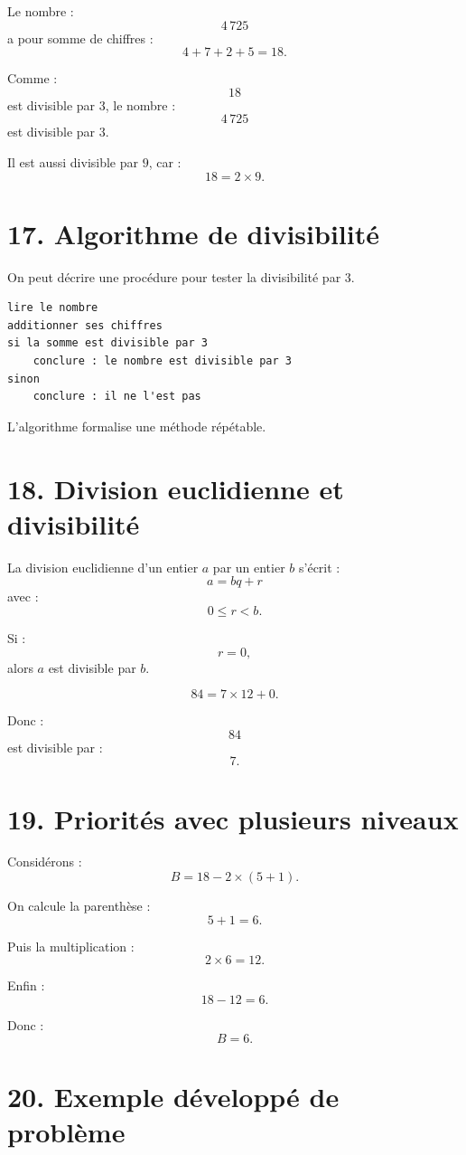Le nombre :
\[
4\,725
\]
a pour somme de chiffres :
\[
4+7+2+5=18.
\]

Comme :
\[
18
\]
est divisible par $3$, le nombre :
\[
4\,725
\]
est divisible par $3$.

Il est aussi divisible par $9$, car :
\[
18=2\times9.
\]

\section{17. Algorithme de divisibilité}

On peut décrire une procédure pour tester la divisibilité par $3$.

\begin{verbatim}
lire le nombre
additionner ses chiffres
si la somme est divisible par 3
    conclure : le nombre est divisible par 3
sinon
    conclure : il ne l'est pas
\end{verbatim}

L'algorithme formalise une méthode répétable.

\section{18. Division euclidienne et divisibilité}

La division euclidienne d'un entier $a$ par un entier $b$ s'écrit :
\[
a=bq+r
\]
avec :
\[
0\le r<b.
\]

Si :
\[
r=0,
\]
alors $a$ est divisible par $b$.

\begin{exemple}
\[
84=7\times12+0.
\]

Donc :
\[
84
\]
est divisible par :
\[
7.
\]
\end{exemple}

\section{19. Priorités avec plusieurs niveaux}

Considérons :
\[
B=18-2\times(5+1).
\]

On calcule la parenthèse :
\[
5+1=6.
\]

Puis la multiplication :
\[
2\times6=12.
\]

Enfin :
\[
18-12=6.
\]

Donc :
\[
\boxed{B=6}.
\]

\section{20. Exemple développé de problème}


